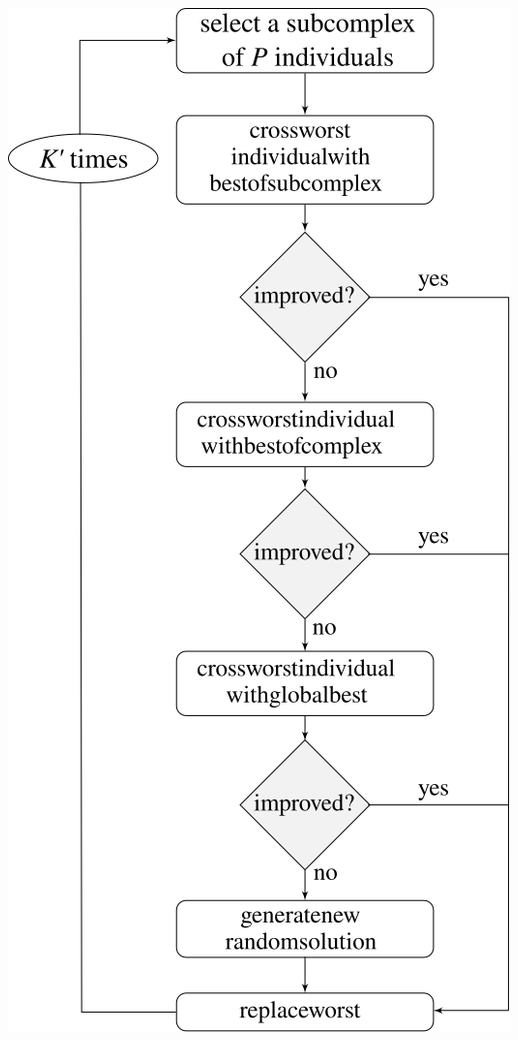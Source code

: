 \documentclass[a0,portrait]{a0poster}
\begin{document}
\begin{multicols}{2}
\begin{center}
\begin{minipage}{0.30\linewidth}
    \includegraphics[scale=1.5]{flow2}
  \label{fig:flow2}
\end{minipage}
\begin{minipage}{0.30\linewidth}

\end{minipage}
\end{center}
\end{multicols}
\end{document}
